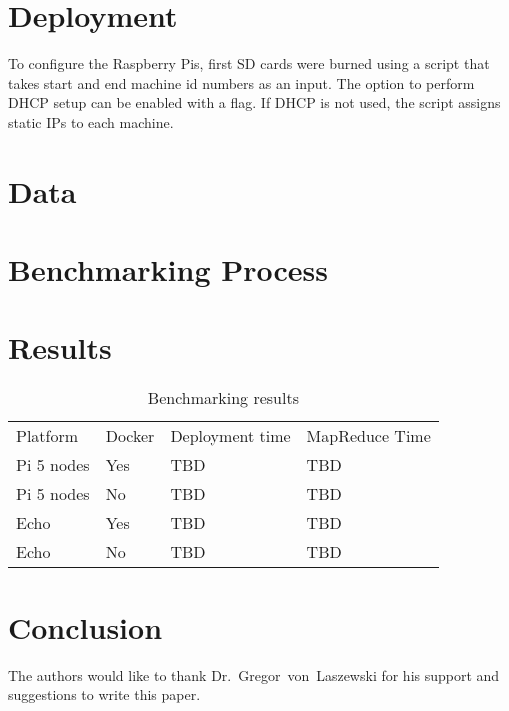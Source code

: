 \section{Deployment}
To configure the Raspberry Pis, first SD cards were burned using a
script that takes start and end machine id numbers as an input. The
option to perform DHCP setup can be enabled with a flag. If DHCP is
not used, the script assigns static IPs to each machine.

\section{Data}


\section{Benchmarking Process}


\section{Results}

\begin{table}[hbt]
\centering
\caption{Benchmarking results}\label{t:results-table}
\begin{tabular}{llll}
Platform    & Docker & Deployment time & MapReduce Time \\
Pi 5 nodes  & Yes    & TBD             & TBD            \\
Pi 5 nodes  & No     & TBD             & TBD            \\
Echo        & Yes    & TBD             & TBD            \\
Echo        & No     & TBD             & TBD            \\
\end{tabular}
\end{table}



\section{Conclusion}



\begin{acks}

  The authors would like to thank Dr.~Gregor~von~Laszewski for his
  support and suggestions to write this paper.

\end{acks}



